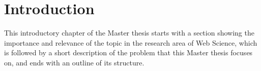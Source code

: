 
\chapter{Introduction} %
\label{cha:introduction}

This introductory chapter of the Master thesis starts with a section showing the importance and relevance of the topic in the research area of Web Science, which is followed by a short description of the problem that this Master thesis focuses on, and ends with an outline of its structure.







